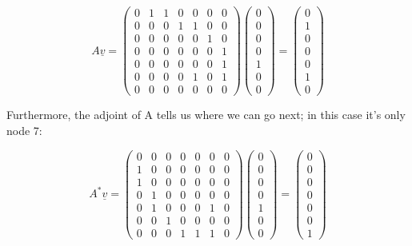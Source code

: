 \documentclass[oneside,english]{amsbook}
\numberwithin{section}{chapter}
\theoremstyle{plain}
\theoremstyle{definition}
\begin{document}
\[A\underline{v} = \begin{pmatrix}
	0 & 1 & 1 & 0 & 0 & 0 & 0 \\
	0 & 0 & 0 & 1 & 1 & 0 & 0 \\
	0 & 0 & 0 & 0 & 0 & 1 & 0 \\
	0 & 0 & 0 & 0 & 0 & 0 & 1 \\
	0 & 0 & 0 & 0 & 0 & 0 & 1 \\
	0 & 0 & 0 & 0 & 1 & 0 & 1 \\
	0 & 0 & 0 & 0 & 0 & 0 & 0
\end{pmatrix}\begin{pmatrix}
	0 \\
	0 \\
	0 \\
	0 \\
	1 \\
	0 \\
	0
\end{pmatrix} = \begin{pmatrix}
	0 \\
	1 \\
	0 \\
	0 \\
	0 \\
	1 \\
	0
\end{pmatrix}\]

Furthermore, the adjoint of A tells us where we can go next; in this
case it's only node 7:

\[A^{*}\underline{v} = \begin{pmatrix}
	0 & 0 & 0 & 0 & 0 & 0 & 0 \\
	1 & 0 & 0 & 0 & 0 & 0 & 0 \\
	1 & 0 & 0 & 0 & 0 & 0 & 0 \\
	0 & 1 & 0 & 0 & 0 & 0 & 0 \\
	0 & 1 & 0 & 0 & 0 & 1 & 0 \\
	0 & 0 & 1 & 0 & 0 & 0 & 0 \\
	0 & 0 & 0 & 1 & 1 & 1 & 0
\end{pmatrix}\begin{pmatrix}
	0 \\
	0 \\
	0 \\
	0 \\
	1 \\
	0 \\
	0
\end{pmatrix} = \begin{pmatrix}
	0 \\
	0 \\
	0 \\
	0 \\
	0 \\
	0 \\
	1
\end{pmatrix}\]
\end{document}
